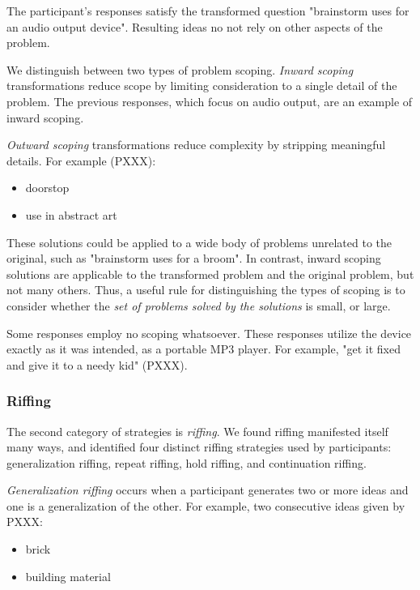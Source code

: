 The participant's responses satisfy the transformed question "brainstorm uses for an audio output device". Resulting ideas no not rely on other aspects of the problem.

We distinguish between two types of problem scoping. \emph{Inward scoping} transformations reduce scope by limiting consideration to a single detail of the problem. The previous responses, which focus on audio output, are an example of inward scoping.

\emph{Outward scoping} transformations reduce complexity by stripping meaningful details. For example (PXXX):

\begin{itemize}
    \item doorstop
    \item use in abstract art
\end{itemize}

These solutions could be applied to a wide body of problems unrelated to the original, such as "brainstorm uses for a broom".
In contrast, inward scoping solutions are applicable to the transformed problem and the original problem, but not many others. Thus, a useful rule for distinguishing the types of scoping is to consider whether the \emph{set of problems solved by the solutions} is small, or large.

Some responses employ no scoping whatsoever. These responses utilize the device exactly as it was intended, as a portable MP3 player. For example, "get it fixed and give it to a needy kid" (PXXX).

\subsubsection{Riffing}

The second category of strategies is \emph{riffing}.
We found riffing manifested itself many ways, and identified four distinct riffing strategies used by participants: generalization riffing, repeat riffing, hold riffing, and continuation riffing. 

\emph{Generalization riffing} occurs when a participant generates two or more ideas and one is a generalization of the other. For example, two consecutive ideas given by PXXX:

\begin{itemize}
    \item brick
    \item building material
\end{itemize}

